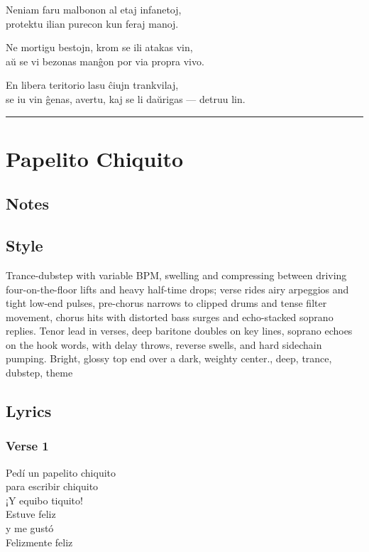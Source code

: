 Neniam faru malbonon al etaj infanetoj,\\
protektu ilian purecon kun feraj manoj.

Ne mortigu bestojn, krom se ili atakas vin,\\
aŭ se vi bezonas manĝon por via propra vivo.

En libera teritorio lasu ĉiujn trankvilaj,\\
se iu vin ĝenas, avertu, kaj se li daŭrigas --- detruu lin.

\begin{center}\rule{0.5\linewidth}{0.5pt}\end{center}

\section{Papelito Chiquito}\label{papelito-chiquito}

\subsection{Notes}\label{notes-34}

\subsection{Style}\label{style-33}

Trance-dubstep with variable BPM, swelling and compressing between
driving four-on-the-floor lifts and heavy half-time drops; verse rides
airy arpeggios and tight low-end pulses, pre-chorus narrows to clipped
drums and tense filter movement, chorus hits with distorted bass surges
and echo-stacked soprano replies. Tenor lead in verses, deep baritone
doubles on key lines, soprano echoes on the hook words, with delay
throws, reverse swells, and hard sidechain pumping. Bright, glossy top
end over a dark, weighty center., deep, trance, dubstep, theme

\subsection{Lyrics}\label{lyrics-33}

\subsubsection{Verse 1}\label{verse-1-17}

Pedí un papelito chiquito\\
para escribir chiquito\\
¡Y equibo tiquito!\\
Estuve feliz\\
y me gustó\\
Felizmente feliz

